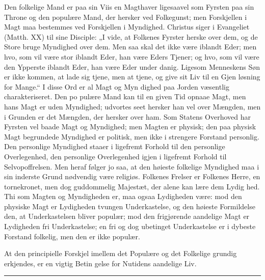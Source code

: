 \documentclass[12pt]{book}
\newcommand{\opage}[1]{\marginnote{\footnotesize\textit{[#1]}}}
\begin{document}
Den folkelige Mand er paa sin Viis en Magthaver
ligesaavel som Fyrsten paa sin Throne og den populære
Mand, der hersker ved Folkegunst; men Forskjellen i
Magt maa bestemmes ved Forskjellen i Myndighed.
Christus siger i Evangeliet (Matth. XX) til sine Disciple:
„I vide, at Folkenes Fyrster herske over dem, og de
Store bruge Myndighed over dem. Men saa skal det
ikke være iblandt Eder; men hvo, som vil være stor
iblandt Eder, han være Eders Tjener; og hvo, som vil
være den Ypperste iblandt Eder, han være Eder under\-%
danig. Ligesom Menneskens Søn er ikke kommen, at
lade sig tjene, men at tjene, og give sit Liv til en Gjen\-%
løsning for Mange.“ I disse Ord er al Magt og Myn\-%
dighed paa Jorden væsentlig charakteriseret. Den po\-%
pulære Mand kan til en given Tid opnaae Magt, men
hans Magt er uden Myndighed; udvortes seet hersker
han vel over Mængden, men i Grunden er det Mængden,
\opage{134}\setcounter{footnote}{0}%
der hersker over ham. Som Statens Overhoved har
Fyrsten vel baade Magt og Myndighed; men Magten er
physisk; den paa physisk Magt begrundede Myndighed
er politisk, men ikke i strengere Forstand personlig.
Den personlige Myndighed staaer i ligefremt Forhold til
den personlige Overlegenhed, den personlige Overlegenhed
igjen i ligefremt Forhold til Selvopoffrelsen. Men heraf
følger jo saa, at den høieste folkelige Myndighed maa i
sin inderste Grund nødvendig være religiøs. Folkenes
Frelser er Folkenes Herre, en tornekronet, men dog
guddommelig Majestæt, der alene kan lære dem Lydig\-%
hed. Thi som Magten og Myndigheden er, maa ogsaa
Lydigheden være: mod den physiske Magt er Lydigheden
tvungen Underkastelse, og den høieste Formildelse den,
at Underkastelsen bliver populær; mod den frigjørende
aandelige Magt er Lydigheden fri Underkastelse; en fri
og dog ubetinget Underkastelse er i dybeste Forstand
folkelig, men den er ikke populær.

At den principielle Forskjel imellem det Populære
og det Folkelige grundig erkjendes, er en vigtig Betin\-%
gelse for Nutidens aandelige Liv.

\begin{center}\rule{3cm}{0.4pt}\end{center}
\end{document}
